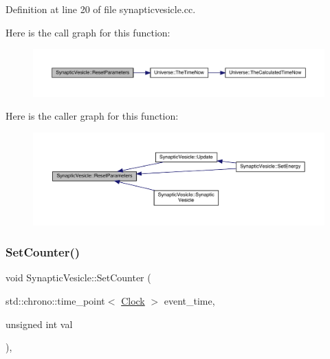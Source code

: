 Definition at line 20 of file synapticvesicle.\+cc.

Here is the call graph for this function\+:
\nopagebreak
\begin{figure}[H]
\begin{center}
\leavevmode
\includegraphics[width=350pt]{class_synaptic_vesicle_add2f2815448729977fbcdbd5a59ec7b4_cgraph}
\end{center}
\end{figure}
Here is the caller graph for this function\+:
\nopagebreak
\begin{figure}[H]
\begin{center}
\leavevmode
\includegraphics[width=350pt]{class_synaptic_vesicle_add2f2815448729977fbcdbd5a59ec7b4_icgraph}
\end{center}
\end{figure}
\mbox{\label{class_synaptic_vesicle_a7fd7cfce5eccb904206d968866f85220}} 
\subsubsection{\texorpdfstring{Set\+Counter()}{SetCounter()}}
{\footnotesize\ttfamily void Synaptic\+Vesicle\+::\+Set\+Counter (\begin{DoxyParamCaption}\item[{std\+::chrono\+::time\+\_\+point$<$ \hyperlink{universe_8h_a0ef8d951d1ca5ab3cfaf7ab4c7a6fd80}{Clock} $>$}]{event\+\_\+time,  }\item[{unsigned int}]{val }\end{DoxyParamCaption})\hspace{0.3cm}{\ttfamily [inline]}, {\ttfamily [virtual]}}



